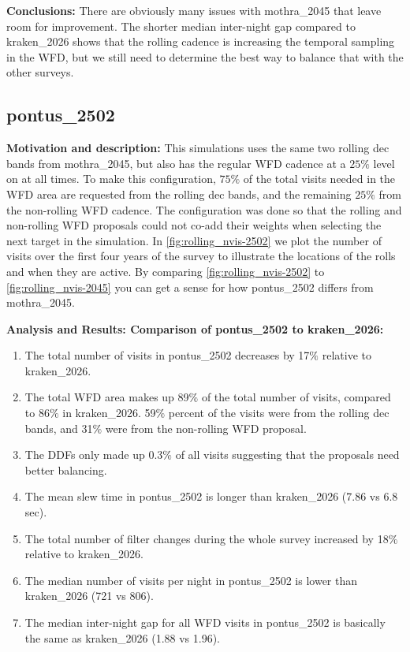 \documentclass[DM,authoryear,toc]{lsstdoc}
\begin{document}
\textbf{Conclusions:} There are obviously many issues with mothra\_2045 that leave room for improvement. The shorter median inter-night
gap compared to kraken\_2026 shows that the rolling cadence is increasing the temporal sampling in the WFD, but we still need to determine
the best way to balance that with the other surveys.

\subsection{pontus\_2502} \label{pontus2502}

\textbf{Motivation and description:} This simulations uses the same two rolling dec bands from mothra\_2045, but also has the
regular WFD cadence at a $25\%$ level on at all times. To make this configuration, $75\%$ of the total visits needed in the WFD area are requested from the
rolling dec bands, and the remaining $25\%$ from the non-rolling WFD cadence. The configuration was done so that the rolling and non-rolling WFD
proposals could not co-add their weights when selecting the next target in the simulation. In \autoref{fig:rolling_nvis-2502} we plot the number
of visits over the first four years of the survey to illustrate the locations of the rolls and when they are active. By comparing \autoref{fig:rolling_nvis-2502}
to \autoref{fig:rolling_nvis-2045} you can get a sense for how pontus\_2502 differs from mothra\_2045.

\textbf{Analysis and Results: Comparison of pontus\_2502 to kraken\_2026:}


\begin{enumerate}
\item The total number of visits in pontus\_2502 decreases by 17$\%$ relative to kraken\_2026.
\item The total WFD area makes up 89$\%$ of the total number of visits, compared to 86$\%$ in kraken\_2026.
59$\%$ percent of the visits were from the rolling dec bands, and 31$\%$ were from the non-rolling WFD proposal.
\item The DDFs only made up  0.3$\%$ of all visits suggesting that the proposals need better balancing.
\item The mean slew time in pontus\_2502 is longer than kraken\_2026 (7.86 vs 6.8 sec).
\item The total number of filter changes during the whole survey increased by 18$\%$ relative to kraken\_2026.
\item The median number of visits per night in pontus\_2502 is lower than kraken\_2026 (721 vs 806).
\item The median inter-night gap for all WFD visits in pontus\_2502 is basically the same as kraken\_2026  (1.88 vs 1.96).
\end{enumerate}
\end{document}
